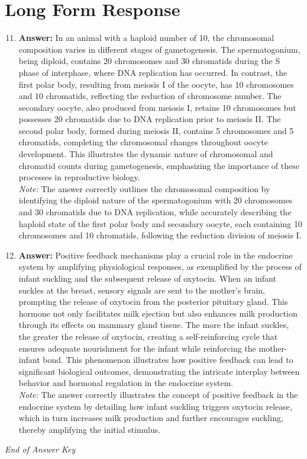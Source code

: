 \documentclass[12pt]{article}
\begin{document}
\section*{Long Form Response}
\begin{enumerate}[label=\arabic*.]
\setcounter{enumi}{10}
\item \textbf{Answer:} In an animal with a haploid number of 10, the chromosomal composition varies in different stages of gametogenesis. The spermatogonium, being diploid, contains 20 chromosomes and 30 chromatids during the S phase of interphase, where DNA replication has occurred. In contrast, the first polar body, resulting from meiosis I of the oocyte, has 10 chromosomes and 10 chromatids, reflecting the reduction of chromosome number. The secondary oocyte, also produced from meiosis I, retains 10 chromosomes but possesses 20 chromatids due to DNA replication prior to meiosis II. The second polar body, formed during meiosis II, contains 5 chromosomes and 5 chromatids, completing the chromosomal changes throughout oocyte development. This illustrates the dynamic nature of chromosomal and chromatid counts during gametogenesis, emphasizing the importance of these processes in reproductive biology.
\\ \textit{Note:} The answer correctly outlines the chromosomal composition by identifying the diploid nature of the spermatogonium with 20 chromosomes and 30 chromatids due to DNA replication, while accurately describing the haploid state of the first polar body and secondary oocyte, each containing 10 chromosomes and 10 chromatids, following the reduction division of meiosis I.
\item \textbf{Answer:} Positive feedback mechanisms play a crucial role in the endocrine system by amplifying physiological responses, as exemplified by the process of infant suckling and the subsequent release of oxytocin. When an infant suckles at the breast, sensory signals are sent to the mother's brain, prompting the release of oxytocin from the posterior pituitary gland. This hormone not only facilitates milk ejection but also enhances milk production through its effects on mammary gland tissue. The more the infant suckles, the greater the release of oxytocin, creating a self-reinforcing cycle that ensures adequate nourishment for the infant while reinforcing the mother-infant bond. This phenomenon illustrates how positive feedback can lead to significant biological outcomes, demonstrating the intricate interplay between behavior and hormonal regulation in the endocrine system.
\\ \textit{Note:} The answer correctly illustrates the concept of positive feedback in the endocrine system by detailing how infant suckling triggers oxytocin release, which in turn increases milk production and further encourages suckling, thereby amplifying the initial stimulus.
\end{enumerate}

\vfill
\noindent\textit{End of Answer Key}
\end{document}
